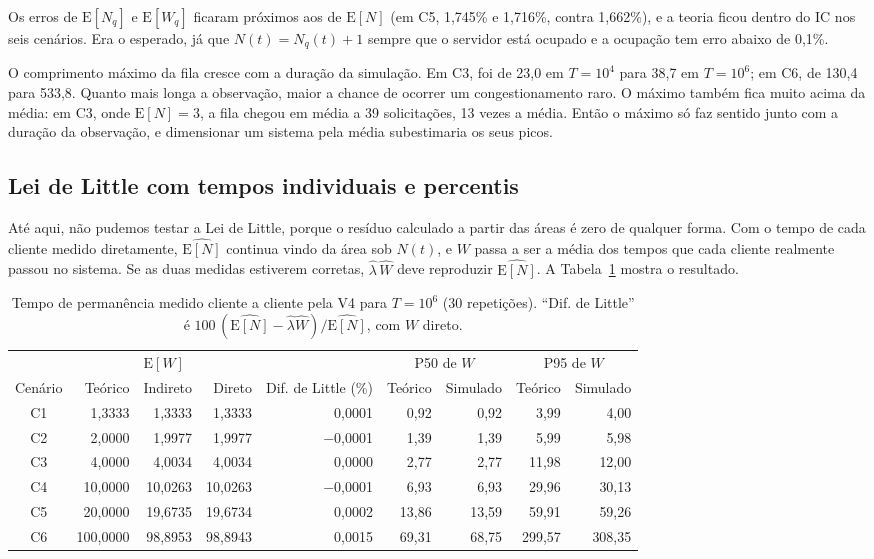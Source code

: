 \documentclass[
  article,      %
  10pt,         %
  oneside,
  a4paper,
  twocolumn,    %
  english,
  brazil        %
]{abntex2}
\newcommand{\EN}{\mathrm{E}[N]}
\newcommand{\EW}{\mathrm{E}[W]}
\newcommand{\ENq}{\mathrm{E}[N_q]}
\newcommand{\EWq}{\mathrm{E}[W_q]}
\begin{document}
Os erros de $\ENq$ e $\EWq$ ficaram próximos aos de $\EN$ (em C5, 1,745\% e 1,716\%, contra 1,662\%), e a teoria ficou dentro do IC nos seis cenários. Era o esperado, já que $N(t)=N_q(t)+1$ sempre que o servidor está ocupado e a ocupação tem erro abaixo de 0,1\%.

O comprimento máximo da fila cresce com a duração da simulação. Em C3, foi de 23,0 em $T=10^4$ para 38,7 em $T=10^6$; em C6, de 130,4 para 533,8. Quanto mais longa a observação, maior a chance de ocorrer um congestionamento raro. O máximo também fica muito acima da média: em C3, onde $\EN=3$, a fila chegou em média a 39 solicitações, 13 vezes a média. Então o máximo só faz sentido junto com a duração da observação, e dimensionar um sistema pela média subestimaria os seus picos.

\subsection{Lei de Little com tempos individuais e percentis}
\label{sec:little-direto}

Até aqui, não pudemos testar a Lei de Little, porque o resíduo calculado a partir das áreas é zero de qualquer forma. Com o tempo de cada cliente medido diretamente, $\widehat{\EN}$ continua vindo da área sob $N(t)$, e $W$ passa a ser a média dos tempos que cada cliente realmente passou no sistema. Se as duas medidas estiverem corretas, $\widehat{\lambda}\,\widehat{W}$ deve reproduzir $\widehat{\EN}$. A Tabela~\ref{tab:little-direto} mostra o resultado.

\begin{table}[t]
  \centering
  \caption{Tempo de permanência medido cliente a cliente pela V4 para $T=10^6$ (30 repetições). ``Dif. de Little'' é $100\,(\widehat{\EN}-\widehat{\lambda}\widehat{W})/\widehat{\EN}$, com $W$ direto.}
  \label{tab:little-direto}
  \small
  \begin{tabular}{crrrrrrrr}
    \toprule
    & \multicolumn{3}{c}{$\EW$} & & \multicolumn{2}{c}{P50 de $W$} & \multicolumn{2}{c}{P95 de $W$} \\
    \cmidrule(lr){2-4}\cmidrule(lr){6-7}\cmidrule(lr){8-9}
    Cenário & Teórico & Indireto & Direto & Dif. de Little (\%) & Teórico & Simulado & Teórico & Simulado \\
    \midrule
    C1 & 1,3333 & 1,3333 & 1,3333 & 0,0001 & 0,92 & 0,92 & 3,99 & 4,00 \\
    C2 & 2,0000 & 1,9977 & 1,9977 & $-$0,0001 & 1,39 & 1,39 & 5,99 & 5,98 \\
    C3 & 4,0000 & 4,0034 & 4,0034 & 0,0000 & 2,77 & 2,77 & 11,98 & 12,00 \\
    C4 & 10,0000 & 10,0263 & 10,0263 & $-$0,0001 & 6,93 & 6,93 & 29,96 & 30,13 \\
    C5 & 20,0000 & 19,6735 & 19,6734 & 0,0002 & 13,86 & 13,59 & 59,91 & 59,26 \\
    C6 & 100,0000 & 98,8953 & 98,8943 & 0,0015 & 69,31 & 68,75 & 299,57 & 308,35 \\
    \bottomrule
  \end{tabular}
\end{table}
\end{document}
